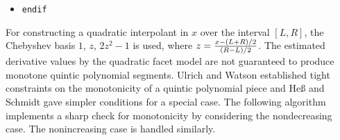 {\begin{itemize}
\begin{itemize}
{{magnitude second derivative among existing quadratics is chosen.}}
\item[]{ $f_1\:\hbox{interpolant to }(X_{i-2},Y_{i-2})$,
  $(X_{i-1},Y_{i-1})$, and $(X_i,Y_i)$.}
\item[]{ $f_2\:\hbox{interpolant to }(X_{i-1},Y_{i-1})$,
  $(X_i,Y_i)$, and $(X_{i+1},Y_{i+1})$.}
\item[]{ $f_3\:\hbox{interpolant to }(X_i,Y_i)$,
  $(X_{i+1},Y_{i+1})$, and $(X_{i+2},Y_{i+2})$.}
\item[]{ {\tt if} $\bigl(Df_1(X_i)(Y_i-Y_{i-1}) \ge 0 \wedge
  |D^2f_1| = \min\bigl\{ |D^2f_1|,
  |D^2f_2|, |D^2f_3|\bigr\} \bigr)$ {\tt then}}
\item[]{  $\bigl(Df_1(X_i),D^2f_1\bigr)$}
\item[]{ {\tt else if} $\bigl(Df_2(X_i)(Y_i-Y_{i-1}) \ge 0 \wedge
  |D^2f_2| = \min\bigl\{ |D^2f_1|,
  |D^2f_2|, |D^2f_3|\bigr\} \bigr)$}
\item[]{  $\bigl(Df_2(X_i),D^2f_2\bigr)$}
\item[]{ {\tt else if} $\bigl(Df_3(X_i)(Y_{i+1}-Y_i) \ge 0\bigr)$ {\tt then}}
\item[]{  $\bigl(Df_3(X_i),D^2f_3\bigr)$}
\item[]{ {\tt else return} $(0, 0)$}
\item[]{ {\tt endif}}
\end{itemize}
\item[]{ {\tt endif}}
\end{itemize}
}
\vskip 5mm

For constructing a quadratic interpolant in $x$ over the interval
$[L,R]$, the Chebyshev basis $1$, $z$, $2z^2-1$ is used, where
$z={x-(L+R)/2 \over (R-L)/2}$. The estimated derivative values by the
quadratic facet model are not guaranteed to produce monotone quintic
polynomial segments. Ulrich and Watson \cite{ulrich1990positivity}
established tight constraints on the monotonicity of a quintic
polynomial piece and He{\ss} and Schmidt \cite{hess1994positive} gave
simpler conditions for a special case.  The following algorithm
implements a sharp check for monotonicity by considering the
nondecreasing case. The nonincreasing case is handled similarly.


